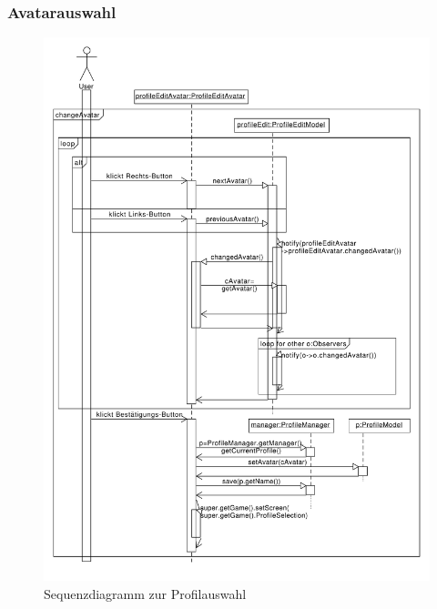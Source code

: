 \subsubsection{Avatarauswahl}
\begin{figure}[H]
\centering
\includegraphics[scale=0.50]{./sections/sequence_diagrams/profile_scenarios/ProfileAvatarauswahl.pdf}
\caption{Sequenzdiagramm zur Profilauswahl}
\end{figure}